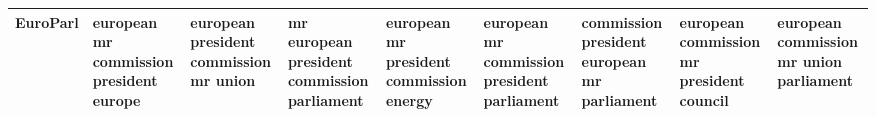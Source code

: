 \documentclass[11pt,a4paper]{article}
\begin{document}
\begin{appendices}
\begin{table*}[htp]
\begin{tiny}
\begin{tabular}{|p{}|p{}|p{}|p{}|p{}|p{}|p{}|p{}|p{}|}
EuroParl & european \newline mr \newline commission \newline president \newline europe & european \newline president \newline commission \newline mr \newline union & mr \newline european \newline president \newline commission \newline parliament & european \newline mr \newline president \newline commission \newline energy & european \newline mr \newline commission \newline president \newline parliament & commission \newline president \newline european \newline mr \newline parliament & european \newline commission \newline mr \newline president \newline council & european \newline commission \newline mr \newline union \newline parliament\\\hline

\end{tabular}
\end{tiny}
\end{table*}
\end{appendices}
\end{document}
